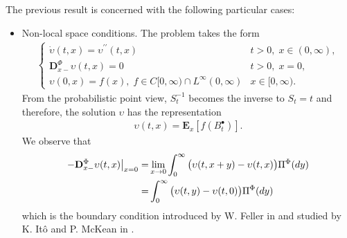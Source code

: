 \documentclass[11pt,a4paper]{article}
\theoremstyle{plain}
\theoremstyle{definition}
\theoremstyle{remark}
\begin{document}
	
	The previous result is concerned with the following particular cases:
	\begin{itemize}
		\item[$\eta=0$)] Non-local space conditions. The problem takes the form
		\begin{align*}
			\begin{cases}
				\displaystyle 	\dot{\upsilon}(t,x)= \upsilon^{\prime \prime}(t,x) & t>0,\; x \in (0,\infty),\\
				\displaystyle  \mathbf{D}_{x-}^\Phi \upsilon(t,x)=0   & t>0,\; x=0,\\
				\displaystyle 	\upsilon(0,x)=f(x), \; f \in C[0,\infty) \cap L^\infty(0, \infty)  &x\in [0, \infty).
			\end{cases}
		\end{align*}
		From the probabilistic point view, $S^{-1}_t$ becomes the inverse to $S_t = t$ and therefore, the solution $\upsilon$ has the representation
		\begin{align*}
			\upsilon(t,x) = \mathbf{E}_x \left[f(B^\bullet_t) \right].
		\end{align*}
		We observe that
		\begin{align}
			\label{integralMarchaud}
			-\mathbf{D}_{x-}^\Phi \upsilon(t,x) \big\vert_{x=0} 
			= & \lim_{x \to 0} \int_0^\infty \big(\upsilon(t,x+y) - \upsilon(t,x)\big) \Pi^\Phi(dy) \notag \\
			= & \int_0^\infty \big(\upsilon(t,y) - \upsilon(t,0)\big) \Pi^\Phi(dy)
		\end{align}
		which is the boundary condition introduced by W. Feller in  \cite{feller1952parabolic} and studied by K. It{\^o} and P. McKean  in \cite[section 12]{ito1963brownian}.\\
		

\end{itemize}
\end{document}
